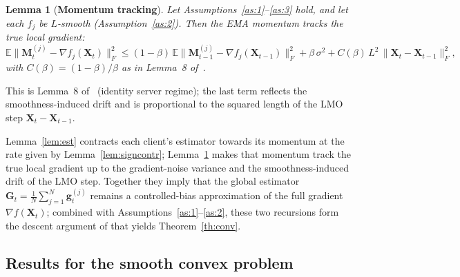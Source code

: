 \documentclass{article}
\newtheorem{lemma}{Lemma}
\begin{document}
\begin{lemma}[\textbf{Momentum tracking}]\label{lem:mom}
Let Assumptions~\ref{as:1}--\ref{as:3} hold, and let each $f_j$ be $L$-smooth (Assumption~\ref{as:2}). Then the EMA momentum tracks the true local gradient:
\begin{equation}
\mathbb{E}\|\mathbf{M}_t^{(j)}-\nabla f_j(\mathbf{X}_t)\|_F^2 \le (1-\beta)\,\mathbb{E}\|\mathbf{M}_{t-1}^{(j)}-\nabla f_j(\mathbf{X}_{t-1})\|_F^2 + \beta\,\sigma^2 + C(\beta)\,L^2\,\|\mathbf{X}_t-\mathbf{X}_{t-1}\|_F^2,
\end{equation}
with $C(\beta)=(1-\beta)/\beta$ as in Lemma~8 of~\cite{gruntkowska2025error}.
\end{lemma}
\noindent This is Lemma~8 of~\cite{gruntkowska2025error} (identity server regime); the last term reflects the smoothness-induced drift and is proportional to the squared length of the LMO step $\mathbf{X}_t-\mathbf{X}_{t-1}$.

Lemma~\ref{lem:est} contracts each client's estimator towards its momentum at the rate given by Lemma~\ref{lem:signcontr}; Lemma~\ref{lem:mom} makes that momentum track the true local gradient up to the gradient-noise variance and the smoothness-induced drift of the LMO step. Together they imply that the global estimator $\mathbf{G}_t=\tfrac{1}{N}\sum_{j=1}^N\mathbf{g}_t^{(j)}$ remains a controlled-bias approximation of the full gradient~$\nabla f(\mathbf{X}_t)$; combined with Assumptions~\ref{as:1}--\ref{as:2}, these two recursions form the descent argument of \citet[Theorem~19]{gruntkowska2025error} that yields Theorem~\ref{th:conv}.



\newpage
\subsection{Results for the smooth convex problem}\label{app:images_task}
\end{document}
